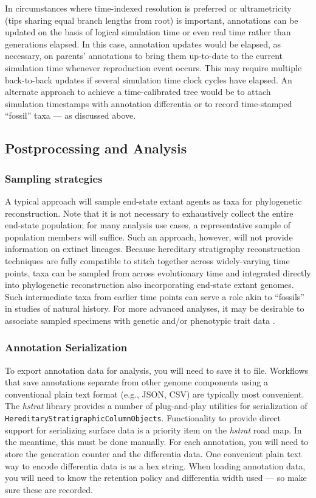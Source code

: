 In circumstances where time-indexed resolution is preferred or ultrametricity (tips sharing equal branch lengths from root) is important, annotations can be updated on the basis of logical simulation time or even real time rather than generations elapsed.
In this case, annotation updates would be elapsed, as necessary, on parents' annotations to bring them up-to-date to the current simulation time whenever reproduction event occurs.
This may require multiple back-to-back updates if several simulation time clock cycles have elapsed.
An alternate approach to achieve a time-calibrated tree would be to attach simulation timestamps with annotation differentia or to record time-stamped ``fossil'' taxa --- as discussed above.

\subsection{Postprocessing and Analysis}

\subsubsection{Sampling strategies}

A typical approach will sample end-state extant agents as taxa for phylogenetic reconstruction.
Note that it is not necessary to exhaustively collect the entire end-state population; for many analysis use cases, a representative sample of population members will suffice.
Such an approach, however, will not provide information on extinct lineages.
Because hereditary stratigraphy reconstruction techniques are fully compatible to stitch together across widely-varying time points, taxa can be sampled from across evolutionary time and integrated directly into phylogenetic reconstruction also incorporating end-state extant genomes.
Such intermediate taxa from earlier time points can serve a role akin to ``fossils'' in studies of natural history.
For more advanced analyses, it may be desirable to associate sampled specimens with genetic and/or phenotypic trait data \citep{dolson2019modes,khabbazian2016fast}.

\subsubsection{Annotation Serialization}

To export annotation data for analysis, you will need to save it to file.
Workflows that save annotations separate from other genome components using a conventional plain text format (e.g., JSON, CSV) are typically most convenient.
The \textit{hstrat} library provides a number of plug-and-play utilities for serialization of \texttt{HereditaryStratigraphicColumnObjects}.
Functionality to provide direct support for serializing surface data is a priority item on the \textit{hstrat} road map.
In the meantime, this must be done manually.
For each annotation, you will need to store the generation counter and the differentia data.
One convenient plain text way to encode differentia data is as a hex string.
When loading annotation data, you will need to know the retention policy and differentia width used --- so make sure these are recorded.

